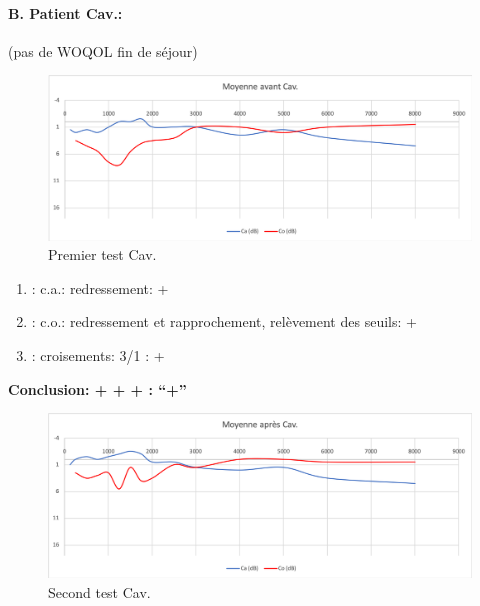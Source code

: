 \paragraph{B. Patient Cav.: }

(pas de WOQOL fin de séjour)
\begin{figure}%
\centering
\includegraphics[width=1\linewidth]{images/graphiques/cav_pre.png}
\caption[Patient B. : 1° test]{Premier test Cav.}

\end{figure}

	\begin{enumerate}

 		\item : c.a.: redressement: +

 		\item : c.o.: redressement et rapprochement, relèvement des seuils: +
 		\item : croisements: 3/1 :  +

                \end{enumerate}

                \textbf{  Conclusion:  + + +       : ``+''}

                \begin{figure}%
\centering
\includegraphics[width=1\linewidth]{images/graphiques/cav_post.png}
\caption[Patient B. : 2° test]{Second test Cav.}

                \end{figure}
